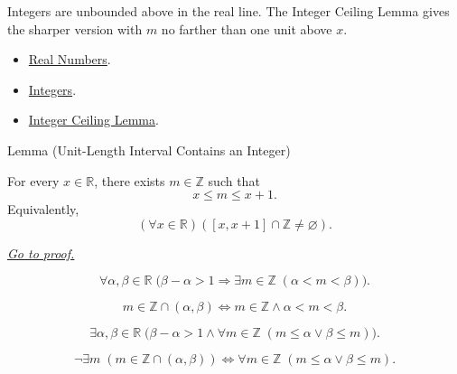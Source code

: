 \begin{remark*}[Interpretation]
Integers are unbounded above in the real line. The Integer Ceiling Lemma gives
the sharper version with $m$ no farther than one unit above $x$.
\end{remark*}

\begin{dependencies}
\begin{itemize}
\item \hyperref[def:reals]{Real Numbers}.
\item \hyperref[def:integers]{Integers}.
\item \hyperref[lem:integer-ceiling-lemma]{Integer Ceiling Lemma}.
\end{itemize}
\end{dependencies}



\begin{lemmabox}{Lemma (Unit-Length Interval Contains an Integer)}
\begin{lemma}
\label{lem:unit-length-interval-contains-integer}
For every $x\in\mathbb{R}$, there exists $m\in\mathbb{Z}$ such that
\[
  x\leq m\leq x+1.
\]
Equivalently,
\[
  (\forall x\in\mathbb{R})([x,x+1]\cap\mathbb{Z}\neq\varnothing).
\]

\smallskip
\noindent
\hyperref[prf:unit-length-interval-contains-integer]{\textit{Go to proof.}}
\end{lemma}
\end{lemmabox}

\begin{remark*}
\[
\forall \alpha,\beta\in\mathbb{R}\;
\bigl(\beta-\alpha>1\Longrightarrow
\exists m\in\mathbb{Z}\;(\alpha<m<\beta)\bigr).
\]
\end{remark*}

\begin{remark*}
\[
m\in\mathbb{Z}\cap(\alpha,\beta)
\Longleftrightarrow
m\in\mathbb{Z}\land \alpha<m<\beta.
\]
\end{remark*}

\begin{remark*}
\[
\exists \alpha,\beta\in\mathbb{R}\;
\bigl(\beta-\alpha>1\land
\forall m\in\mathbb{Z}\;(m\le \alpha\lor \beta\le m)\bigr).
\]
\end{remark*}

\begin{remark*}
\[
\neg\exists m\;(m\in\mathbb{Z}\cap(\alpha,\beta))
\Longleftrightarrow
\forall m\in\mathbb{Z}\;(m\le \alpha\lor \beta\le m).
\]
\end{remark*}

